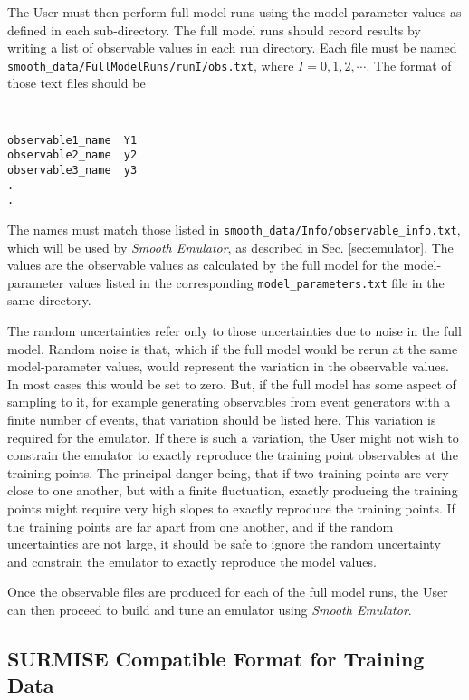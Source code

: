 \documentclass[UserManual.tex]{subfiles}
\begin{document}
The User must then perform full model runs using the model-parameter values as defined in each sub-directory. The full model runs should record results by writing a list of observable values in each run directory. Each file must be named {\tt smooth\_data/FullModelRuns/runI/obs.txt}, where $I=0,1,2,\cdots$. The format of those text files should be
{\tt
\begin{verbatim}
observable1_name  Y1  
observable2_name  y2  
observable3_name  y3  
.
.
\end{verbatim}
}
The names must match those listed in {\tt smooth\_data/Info/observable\_info.txt}, which will be used by {\it Smooth Emulator}, as described in Sec. \ref{sec:emulator}. The values are the observable values as calculated by the full model for the model-parameter values listed in the corresponding {\tt model\_parameters.txt} file in the same directory.

The random uncertainties refer only to those uncertainties due to noise in the full model. Random noise is that, which if the full model would be rerun at the same model-parameter values, would represent the variation in the observable values. In most cases this would be set to zero. But, if the full model has some aspect of sampling to it, for example generating observables from event generators with a finite number of events, that variation should be listed here. This variation is required for the emulator. If there is such a variation, the User might not wish to constrain the emulator to exactly reproduce the training point observables at the training points. The principal danger being, that if two training points are very close to one another, but with a finite fluctuation, exactly producing the training points might require very high slopes to exactly reproduce the training points. If the training points are far apart from one another, and if the random uncertainties are not large, it should be safe to ignore the random uncertainty and constrain the emulator to exactly reproduce the model values. 

Once the observable files are produced for each of the full model runs, the User can then proceed to build and tune an emulator using {\it Smooth Emulator}.

\subsection{SURMISE Compatible Format for Training Data}
\end{document}
